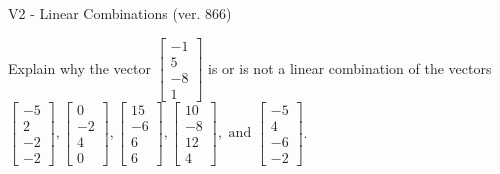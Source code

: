 \begin{exercise}
  \begin{exerciseTitle}V2 - Linear Combinations (ver. 866)\end{exerciseTitle}
  \begin{exerciseStatement}
    Explain why the vector \(\left[\begin{array}{c}
-1 \\
5 \\
-8 \\
1
\end{array}\right]\)  is or is not a linear 
	combination of the vectors \(\left[\begin{array}{c}
-5 \\
2 \\
-2 \\
-2
\end{array}\right] , \left[\begin{array}{c}
0 \\
-2 \\
4 \\
0
\end{array}\right] , \left[\begin{array}{c}
15 \\
-6 \\
6 \\
6
\end{array}\right] , \left[\begin{array}{c}
10 \\
-8 \\
12 \\
4
\end{array}\right] , \text{ and } \left[\begin{array}{c}
-5 \\
4 \\
-6 \\
-2
\end{array}\right]\).
	



\end{exerciseStatement}
\end{exercise}
